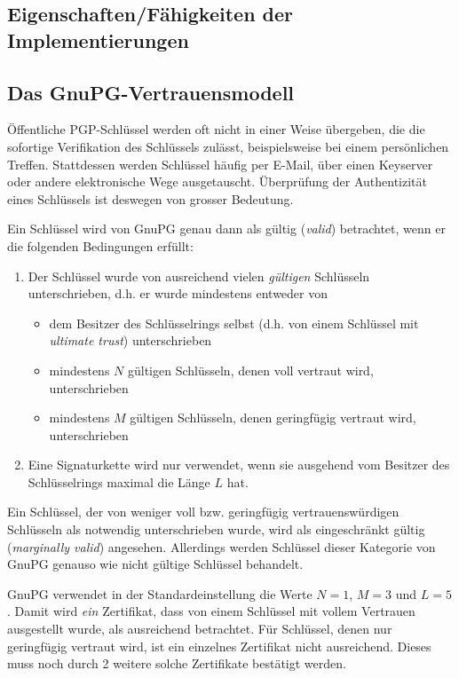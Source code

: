 \subsection{Eigenschaften/Fähigkeiten der Implementierungen}
\label{ch:Grundlagen:sec:PGP:subsec:Eigenschaften}

\subsection{Das GnuPG-Vertrauensmodell}
\label{sec:das-gnupg-vertrauensmodell}

Öffentliche PGP-Schlüssel werden oft nicht in einer Weise übergeben,
die die sofortige Verifikation des Schlüssels zulässt, beispielsweise
bei einem persönlichen Treffen. Stattdessen werden Schlüssel häufig
per E-Mail, über einen Keyserver oder andere elektronische Wege
ausgetauscht.  Überprüfung der Authentizität eines Schlüssels ist
deswegen von grosser Bedeutung.

Ein Schlüssel wird von GnuPG genau dann als gültig (\emph{valid})
betrachtet, wenn er die folgenden Bedingungen erfüllt:

\begin{enumerate}
\item Der Schlüssel wurde von ausreichend vielen \emph{gültigen} Schlüsseln
  unterschrieben, d.h. er wurde mindestens entweder von
  \begin{itemize}
  \item dem Besitzer des Schlüsselrings selbst (d.h. von einem
    Schlüssel mit \emph{ultimate trust}) unterschrieben
  \item mindestens $N$ gültigen Schlüsseln, denen voll vertraut wird, unterschrieben
  \item mindestens $M$ gültigen Schlüsseln, denen geringfügig
    vertraut wird, unterschrieben
  \end{itemize}
\item Eine Signaturkette wird nur verwendet, wenn sie ausgehend vom
  Besitzer des Schlüsselrings maximal die Länge $L$ hat.
\end{enumerate}

Ein Schlüssel, der von weniger voll bzw. geringfügig
vertrauenswürdigen Schlüsseln als notwendig unterschrieben wurde, wird
als eingeschränkt gültig (\emph{marginally valid})
angesehen. Allerdings werden Schlüssel dieser Kategorie von GnuPG
genauso wie nicht gültige Schlüssel behandelt.

GnuPG verwendet in der Standardeinstellung die Werte $N=1$, $M=3$ und
$L=5$. Damit wird \emph{ein} Zertifikat, dass von einem Schl\"ussel
mit vollem Vertrauen ausgestellt wurde, als ausreichend
betrachtet. F\"ur Schl\"ussel, denen nur geringf\"ugig vertraut wird,
ist ein einzelnes Zertifikat nicht ausreichend. Dieses muss noch durch
2 weitere solche Zertifikate best\"atigt werden. 

